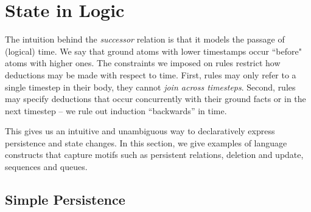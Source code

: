  \section{State in Logic}




The intuition behind the \emph{successor} relation is that it models the
passage of (logical) time.  We say that ground atoms with lower timestamps
occur ``before" atoms with higher ones.
The constraints we imposed on \slang rules restrict how deductions may be made
with respect to time.  First, rules may only refer to a single timestep in
their body, they cannot {\em join across timesteps}.  Second, rules may specify
deductions that occur concurrently with their ground facts or in the next
timestep -- we rule out induction ``backwards'' in time.

This gives us an intuitive and unambiguous way to declaratively express persistence and state changes.  In this section, we 
give examples of language constructs that capture motifs such as persistent relations, deletion and update, sequences
and queues.

\subsection{Simple Persistence}

